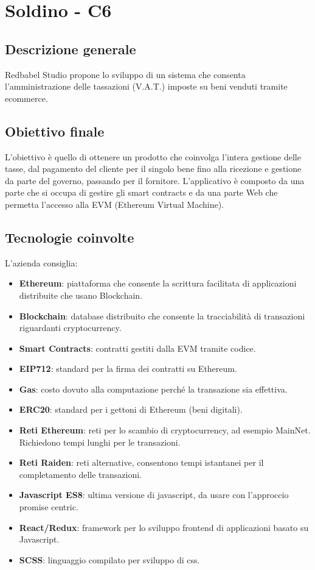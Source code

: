 \section{Soldino - C6} \label{c6}
    \subsection{Descrizione generale}
    Redbabel Studio propone lo sviluppo di un sistema che consenta l'amministrazione delle tassazioni (V.A.T.) imposte su beni venduti tramite ecommerce.
    \subsection{Obiettivo finale}
    
    L'obiettivo è quello di ottenere un prodotto che coinvolga l'intera gestione delle tasse, dal pagamento del cliente per il singolo bene fino alla ricezione e gestione da parte del governo, passando per il fornitore.
    L'applicativo è composto da una parte che si occupa di gestire gli smart contracts e da una parte Web che permetta l'accesso alla EVM (Ethereum Virtual Machine).

    \subsection{Tecnologie coinvolte}
	L'azienda consiglia:
    	\begin{itemize}
        \item \textbf{Ethereum}: piattaforma che consente la scrittura facilitata di applicazioni distribuite che usano Blockchain.
		\item \textbf{Blockchain}: database distribuito che consente la tracciabilità di transazioni riguardanti cryptocurrency.
        \item \textbf{Smart Contracts}: contratti gestiti dalla EVM tramite codice.
		\item \textbf{EIP712}: standard per la firma dei contratti su Ethereum.
		\item \textbf{Gas}: costo dovuto alla computazione perché la transazione sia effettiva.
		\item \textbf{ERC20}: standard per i gettoni di Ethereum (beni digitali).
		\item \textbf{Reti Ethereum}: reti per lo scambio di cryptocurrency, ad esempio MainNet. Richiedono tempi lunghi per le transazioni.
        \item \textbf{Reti Raiden}: reti alternative, consentono tempi istantanei per il completamento delle transazioni.
        \item \textbf{Javascript ES8}: ultima versione di javascript, da usare con l'approccio promise centric.
        \item \textbf{React/Redux}: framework per lo sviluppo frontend di applicazioni basato su Javascript.
        \item \textbf{SCSS}: linguaggio compilato per sviluppo di css.
	\end{itemize}
	
